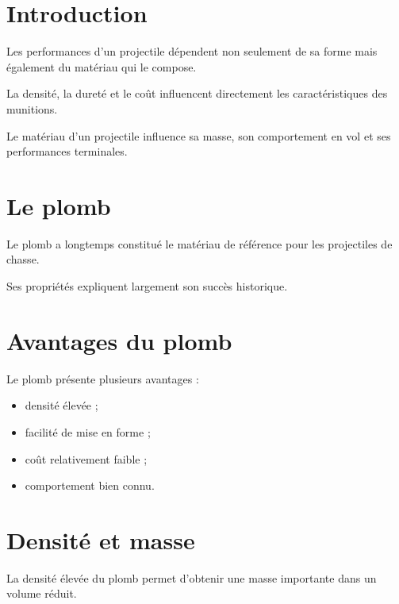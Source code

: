 
\section{Introduction}

Les performances d'un projectile dépendent non seulement de sa forme mais
également du matériau qui le compose.

La densité, la dureté et le coût influencent directement les caractéristiques
des munitions.

\begin{aretenir}

Le matériau d'un projectile influence sa masse, son comportement en vol et ses
performances terminales.

\end{aretenir}

\section{Le plomb}

Le plomb a longtemps constitué le matériau de référence pour les projectiles de
chasse.

Ses propriétés expliquent largement son succès historique.

\section{Avantages du plomb}

Le plomb présente plusieurs avantages :

\begin{itemize}
    \item densité élevée ;
    \item facilité de mise en forme ;
    \item coût relativement faible ;
    \item comportement bien connu.
\end{itemize}

\section{Densité et masse}

La densité élevée du plomb permet d'obtenir une masse importante dans un volume
réduit.

